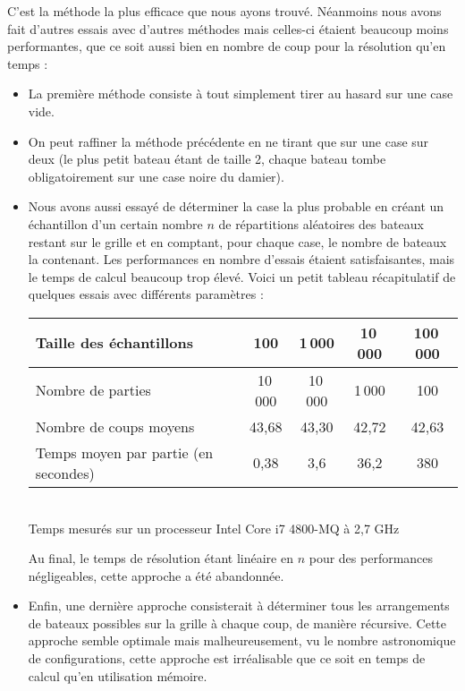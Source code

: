C'est la méthode la plus efficace que nous ayons trouvé. Néanmoins nous avons fait d'autres essais avec d'autres méthodes mais celles-ci étaient beaucoup moins performantes, que ce soit aussi bien en nombre de coup pour la résolution qu'en temps :
\begin{itemize}
\item La première méthode consiste à tout simplement tirer au hasard sur une case vide.
\item On peut raffiner la méthode précédente en ne tirant que sur une case sur deux (le plus petit bateau étant de taille 2, chaque bateau tombe obligatoirement sur une case noire du damier).
\item Nous avons aussi essayé de déterminer la case la plus probable en créant un échantillon d'un certain nombre $n$ de répartitions aléatoires des bateaux restant sur le grille et en comptant, pour chaque case, le nombre de bateaux la contenant. Les performances en nombre d'essais étaient satisfaisantes, mais le temps de calcul beaucoup trop élevé. Voici un petit tableau récapitulatif de quelques essais avec différents paramètres :

\begin{center}
\begin{tabular}{|l|c|c|c|c|}
\hline
Taille des échantillons & 100 & 1\,000 & 10\,000 & 100\,000\\
\hline
Nombre de parties & 10\,000 & 10\,000 & 1\,000 & 100\\
\hline
Nombre de coups moyens & 43,68 & 43,30 & 42,72 & 42,63\\
\hline
Temps moyen par partie (en secondes) & 0,38 & 3,6 & 36,2 & 380\\
\hline 
\end{tabular}\\
Temps mesurés sur un processeur Intel Core i7 4800-MQ à 2,7 GHz
\end{center}

Au final, le temps de résolution étant linéaire en $n$ pour des performances négligeables, cette approche a été abandonnée.

\item Enfin, une dernière approche consisterait à déterminer tous les arrangements de bateaux possibles sur la grille à chaque coup, de manière récursive. Cette approche semble optimale mais malheureusement, vu le nombre astronomique de configurations, cette approche est irréalisable que ce soit en temps de calcul qu'en utilisation mémoire. 

\end{itemize}  

